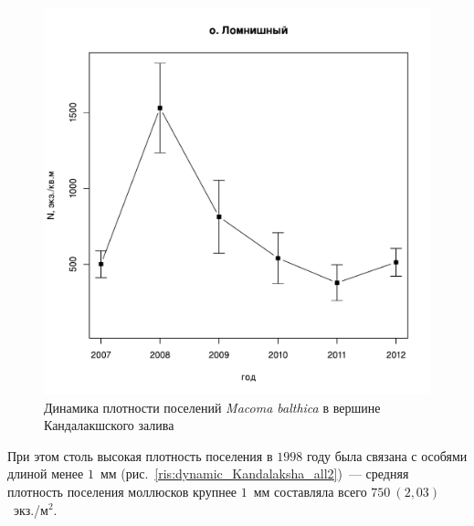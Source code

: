 \begin{figure}[p]
\begin{minipage}[b]{.49\linewidth}
\begin{center}
		\includegraphics[width=\linewidth]{../White_Sea/Lomnishniy/N_dynamic1.pdf}
	\end{center}
	\end{minipage}



	\caption{Динамика плотности поселений {\it Macoma balthica} в вершине Кандалакшского залива}
	\label{ris:dynamic_Kandalaksha_all}
	\end{figure}
При этом столь высокая плотность поселения в $1998$ году была связана с особями длиной менее $1$~мм (рис.~\ref{ris:dynamic_Kandalaksha_all2})~--- средняя плотность поселения моллюсков крупнее $1$~мм составляла всего $750~(2,03)$~экз./м$^2$.
